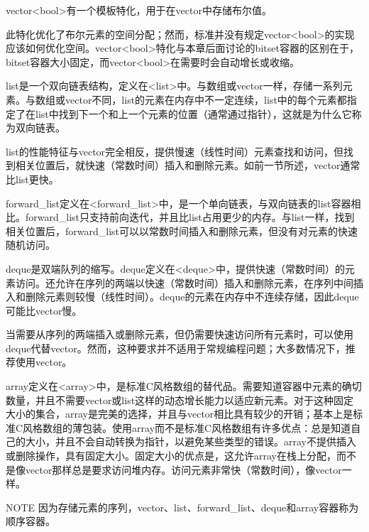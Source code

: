 vector<bool>有一个模板特化，用于在vector中存储布尔值。

此特化优化了布尔元素的空间分配；然而，标准并没有规定vector<bool>的实现应该如何优化空间。vector<bool>特化与本章后面讨论的bitset容器的区别在于，bitset容器大小固定，而vector<bool>在需要时会自动增长或收缩。


list是一个双向链表结构，定义在<list>中。与数组或vector一样，存储一系列元素。与数组或vector不同，list的元素在内存中不一定连续，list中的每个元素都指定了在list中找到下一个和上一个元素的位置（通常通过指针），这就是为什么它称为双向链表。

list的性能特征与vector完全相反，提供慢速（线性时间）元素查找和访问，但找到相关位置后，就快速（常数时间）插入和删除元素。如前一节所述，vector通常比list更快。


forward\_list定义在<forward\_list>中，是一个单向链表，与双向链表的list容器相比。forward\_list只支持前向迭代，并且比list占用更少的内存。与list一样，找到相关位置后，forward\_list可以以常数时间插入和删除元素，但没有对元素的快速随机访问。


deque是双端队列的缩写。deque定义在<deque>中，提供快速（常数时间）的元素访问。还允许在序列的两端以快速（常数时间）插入和删除元素，在序列中间插入和删除元素则较慢（线性时间）。deque的元素在内存中不连续存储，因此deque可能比vector慢。

当需要从序列的两端插入或删除元素，但仍需要快速访问所有元素时，可以使用deque代替vector。然而，这种要求并不适用于常规编程问题；大多数情况下，推荐使用vector。


array定义在<array>中，是标准C风格数组的替代品。需要知道容器中元素的确切数量，并且不需要vector或list这样的动态增长能力以适应新元素。对于这种固定大小的集合，array是完美的选择，并且与vector相比具有较少的开销；基本上是标准C风格数组的薄包装。使用array而不是标准C风格数组有许多优点：总是知道自己的大小，并且不会自动转换为指针，以避免某些类型的错误。array不提供插入或删除操作，具有固定大小。固定大小的优点是，这允许array在栈上分配，而不是像vector那样总是要求访问堆内存。访问元素非常快（常数时间），像vector一样。

\begin{myNotic}{NOTE}
因为存储元素的序列，vector、list、forward\_list、deque和array容器称为顺序容器。
\end{myNotic}

